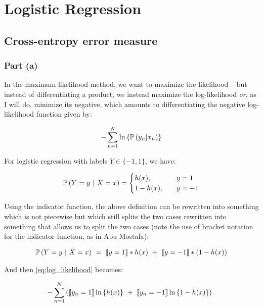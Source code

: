 \section{Logistic Regression}


\subsection{Cross-entropy error measure}

\subsubsection{Part (a)}

In the maximum likelihood method, we want to maximize the likelihood -- but
instead of differentiating a product, we instead maximize the log-likelihood
\textit{or}, as I will do, minimize its negative, which amounts to
differentiating the negative log-likelihood function given by:

\begin{align}
  - \sum_{n = 1}^N \ln \left\{\mathbb P \left(y_n | x_n\right)\right\}\label{eq:log_likelihood}
\end{align}

For logistic regression with labels $Y \in \{-1, 1\}$, we have: 

\begin{align*}
  \mathbb P \left(Y = y\ |\ X = x\right) = 
\begin{cases}
  h(x),\quad &y = 1\\
  1 - h(x),\quad &y = -1
\end{cases}
\end{align*}

Using the indicator function, the above definition can be rewritten into
something which is not piecewise but which still splits the two cases
rewritten into something that allows us to split the two cases (note the use of
bracket notation for the indicator function, as in Abu Mostafa):

\begin{align*}
  \mathbb P \left(Y = y\ |\ X = x\right)\ =\ \llbracket y = 1 \rrbracket * h(x)\ +\ \llbracket y = -1 \rrbracket * (1 -
  h(x))
\end{align*}

And then \cref{eq:log_likelihood} becomes:

\begin{align*}
  - \sum_{n = 1}^N \left(\booltoint{y_n = 1}\lnb{h(x)}\ +\ \booltoint{y_n = -1} \lnb{1 -
  h(x)}\right).
\end{align*}

